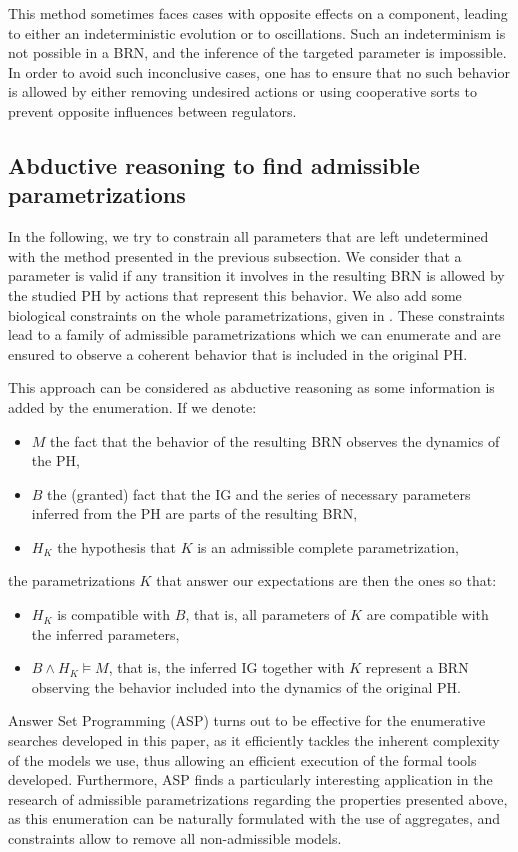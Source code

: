 This method sometimes faces cases with opposite effects on a component, leading to either an indeterministic evolution or to oscillations.
Such an indeterminism is not possible in a BRN, and the inference of the targeted parameter is impossible.
In order to avoid such inconclusive cases, one has to ensure that no such behavior is allowed
by either removing undesired actions or using cooperative sorts to prevent opposite influences between regulators.

\subsection{Abductive reasoning to find admissible parametrizations}\label{ssec:admissible-K}

In the following, we try to constrain all parameters that are left undetermined with the method presented in the previous subsection.
We consider that a parameter is valid if any transition it involves in the resulting BRN is allowed by the studied PH by actions that represent this behavior.
We also add some biological constraints on the whole parametrizations, given in \cite{BernotSemBRN}.
These constraints lead to a family of admissible parametrizations which we can enumerate and are ensured to observe a coherent behavior that is included in the original PH.

This approach can be considered as abductive reasoning as some information is added by the enumeration.
If we denote:
\begin{itemize}
  \item $M$ the fact that the behavior of the resulting BRN observes the dynamics of the PH,
  \item $B$ the (granted) fact that the IG and the series of necessary parameters inferred from the PH are parts of the resulting BRN,
  \item $H_K$ the hypothesis that $K$ is an admissible complete parametrization,
\end{itemize}
the parametrizations $K$ that answer our expectations are then the ones so that:
\begin{itemize}
  \item $H_K$ is compatible with $B$, that is, all parameters of $K$ are compatible with the inferred parameters,
  \item $B \wedge H_K \models M$, that is, the inferred IG together with $K$ represent a BRN observing the behavior included into the dynamics of the original PH.
\end{itemize}

Answer Set Programming (ASP) \cite{Baral03} turns out to be effective for the enumerative searches developed in this paper,
as it efficiently tackles the inherent complexity of the models we use, thus allowing an efficient execution of the formal tools developed.
Furthermore, ASP finds a particularly interesting application in the research of admissible parametrizations regarding the properties presented above, as this enumeration can be naturally formulated with the use of aggregates, and constraints allow to remove all non-admissible models.

